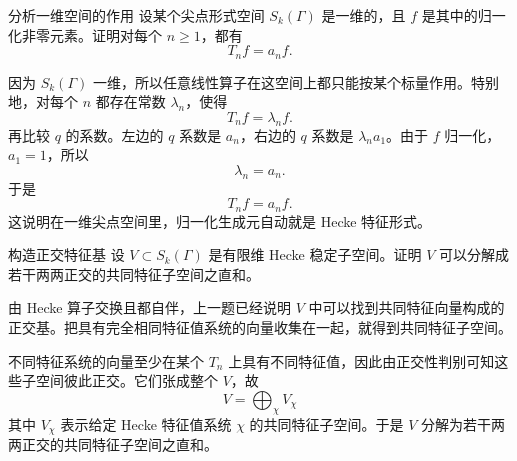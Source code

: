 \begin{problem}{分析一维空间的作用}
\hard
设某个尖点形式空间 $S_k(\Gamma)$ 是一维的，且 $f$ 是其中的归一化非零元素。证明对每个 $n\ge1$，都有
\[
T_nf=a_nf.
\]
\end{problem}
\begin{solution}
因为 $S_k(\Gamma)$ 一维，所以任意线性算子在这空间上都只能按某个标量作用。特别地，对每个 $n$ 都存在常数 $\lambda_n$，使得
\[
T_nf=\lambda_nf.
\]
再比较 $q$ 的系数。左边的 $q$ 系数是 $a_n$，右边的 $q$ 系数是 $\lambda_na_1$。由于 $f$ 归一化，$a_1=1$，所以
\[
\lambda_n=a_n.
\]
于是
\[
T_nf=a_nf.
\]
这说明在一维尖点空间里，归一化生成元自动就是 Hecke 特征形式。
\end{solution}

\begin{problem}{构造正交特征基}
\hard
设 $V\subset S_k(\Gamma)$ 是有限维 Hecke 稳定子空间。证明 $V$ 可以分解成若干两两正交的共同特征子空间之直和。
\end{problem}
\begin{solution}
由 Hecke 算子交换且都自伴，上一题已经说明 $V$ 中可以找到共同特征向量构成的正交基。把具有完全相同特征值系统的向量收集在一起，就得到共同特征子空间。

不同特征系统的向量至少在某个 $T_n$ 上具有不同特征值，因此由正交性判别可知这些子空间彼此正交。它们张成整个 $V$，故
\[
V=\bigoplus_{\chi} V_{\chi}
\]
其中 $V_{\chi}$ 表示给定 Hecke 特征值系统 $\chi$ 的共同特征子空间。于是 $V$ 分解为若干两两正交的共同特征子空间之直和。
\end{solution}
